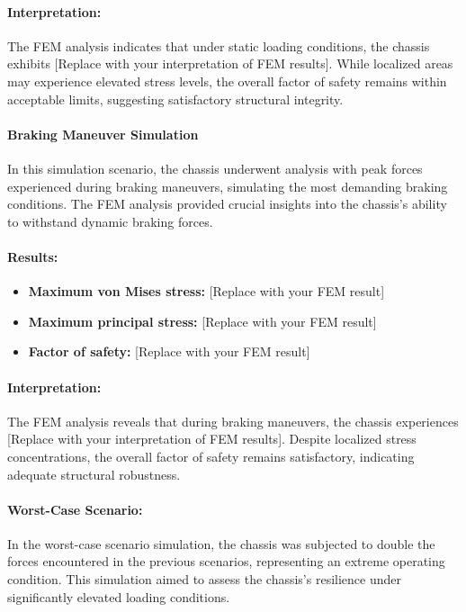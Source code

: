 \paragraph{Interpretation: }
The FEM analysis indicates that under static loading conditions, the chassis exhibits [Replace with your interpretation of FEM results]. While localized areas may experience elevated stress levels, the overall factor of safety remains within acceptable limits, suggesting satisfactory structural integrity.

\paragraph{Braking Maneuver Simulation}
In this simulation scenario, the chassis underwent analysis with peak forces experienced during braking maneuvers, simulating the most demanding braking conditions. The FEM analysis provided crucial insights into the chassis's ability to withstand dynamic braking forces.

\paragraph{Results:}
\begin{itemize}
    \item\textbf{Maximum von Mises stress:} [Replace with your FEM result]
    \item\textbf{Maximum principal stress:} [Replace with your FEM result]
    \item\textbf{Factor of safety:} [Replace with your FEM result]
\end{itemize}

\paragraph{Interpretation: }
The FEM analysis reveals that during braking maneuvers, the chassis experiences [Replace with your interpretation of FEM results]. Despite localized stress concentrations, the overall factor of safety remains satisfactory, indicating adequate structural robustness.

\paragraph{Worst-Case Scenario:}
In the worst-case scenario simulation, the chassis was subjected to double the forces encountered in the previous scenarios, representing an extreme operating condition. This simulation aimed to assess the chassis's resilience under significantly elevated loading conditions.

